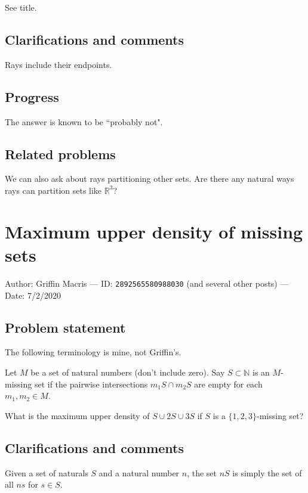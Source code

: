 \documentclass[10pt]{article}
\newenvironment{definition}[1][Definition]{\begin{trivlist}
\item[\hskip \labelsep {\bfseries Definition (#1):}]}{\end{trivlist}}
\begin{document}
See title.

\subsection{Clarifications and comments}

Rays include their endpoints.

\subsection{Progress}

The answer is known to be ``probably not".

\subsection{Related problems}

We can also ask about rays partitioning other sets. Are there any natural ways rays can partition sets like $\mathbb{R}^3$?

\pagebreak

\section{Maximum upper density of missing sets}

Author: Griffin Macris --- ID: \verb`2892565580988030` (and several other posts) --- Date: 7/2/2020

\subsection{Problem statement}

The following terminology is mine, not Griffin's.

\begin{definition}[Missing set]
  Let $M$ be a set of natural numbers (don't include zero). Say $S\subset\mathbb{N}$ is an $M$-missing set if the pairwise intersections $m_1S\cap m_2S$ are empty for each $m_1,m_2\in M$.
\end{definition}

What is the maximum upper density of $S\cup 2S\cup 3S$ if $S$ is a $\{1,2,3\}$-missing set?

\subsection{Clarifications and comments}

Given a set of naturals $S$ and a natural number $n$, the set $nS$ is simply the set of all $ns$ for $s\in S$.
\end{document}
